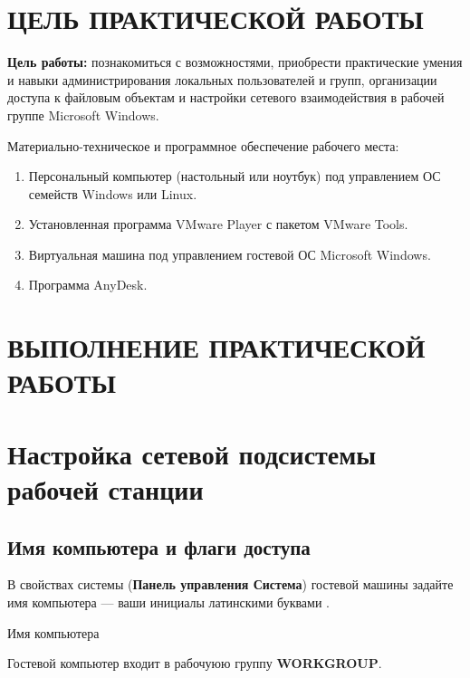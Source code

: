 \section*{ЦЕЛЬ ПРАКТИЧЕСКОЙ РАБОТЫ}

\textbf{Цель работы:} познакомиться с возможностями,
приобрести практические умения и
навыки администрирования локальных пользователей и групп, организации доступа к
файловым объектам и настройки сетевого взаимодействия
в рабочей группе Microsoft Windows.\par
Материально-техническое и программное обеспечение рабочего места:

\begin{enumerate}
	\item Персональный компьютер (настольный или ноутбук)
		под управлением ОС семейств Windows или Linux.
	\item Установленная программа VMware Player с пакетом VMware Tools.
	\item Виртуальная машина под управлением гостевой ОС Microsoft Windows.
	\item Программа AnyDesk.
\end{enumerate}

\clearpage

\section*{ВЫПОЛНЕНИЕ ПРАКТИЧЕСКОЙ РАБОТЫ}

\section{Настройка сетевой подсистемы рабочей станции}

\subsection{Имя компьютера и флаги доступа}

В свойствах системы (\textbf{Панель управления \rarrow Система})
гостевой машины задайте имя компьютера --- ваши инициалы латинскими буквами
.

\begin{image}
	\caption{Имя компьютера}
	\label{fig:name}
\end{image}

Гостевой компьютер входит в рабочуюю группу \textbf{WORKGROUP}.


